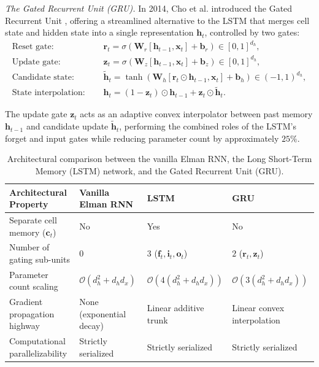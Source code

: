 \documentclass[../../main.tex]{subfiles}
\begin{document}
\textit{The Gated Recurrent Unit (GRU).} In 2014, Cho et al. introduced the Gated Recurrent Unit \citep{cho2014}, offering a streamlined alternative to the LSTM that merges cell state and hidden state into a single representation $\mathbf{h}_t$, controlled by two gates:
\begin{align}
\text{Reset gate: } & \quad \mathbf{r}_t = \sigma\left(\mathbf{W}_r \left[\mathbf{h}_{t-1}, \mathbf{x}_t\right] + \mathbf{b}_r\right) \in [0, 1]^{d_h}, \label{eq:gru_reset_gate} \\
\text{Update gate: } & \quad \mathbf{z}_t = \sigma\left(\mathbf{W}_z \left[\mathbf{h}_{t-1}, \mathbf{x}_t\right] + \mathbf{b}_z\right) \in [0, 1]^{d_h}, \label{eq:gru_update_gate} \\
\text{Candidate state: } & \quad \tilde{\mathbf{h}}_t = \tanh\left(\mathbf{W}_h \left[\mathbf{r}_t \odot \mathbf{h}_{t-1}, \mathbf{x}_t\right] + \mathbf{b}_h\right) \in (-1, 1)^{d_h}, \label{eq:gru_candidate} \\
\text{State interpolation: } & \quad \mathbf{h}_t = \left(1 - \mathbf{z}_t\right) \odot \mathbf{h}_{t-1} + \mathbf{z}_t \odot \tilde{\mathbf{h}}_t. \label{eq:gru_update}
\end{align}

The update gate $\mathbf{z}_t$ acts as an adaptive convex interpolator between past memory $\mathbf{h}_{t-1}$ and candidate update $\tilde{\mathbf{h}}_t$, performing the combined roles of the LSTM's forget and input gates while reducing parameter count by approximately $25\%$.

\begin{table}[htbp]
\centering
\small
\begin{tabularx}{\textwidth}{l X X X}
\toprule
\textbf{Architectural Property} & \textbf{Vanilla Elman RNN} & \textbf{LSTM} & \textbf{GRU} \\
\midrule
Separate cell memory ($\mathbf{c}_t$) & No & Yes & No \\
Number of gating sub-units & $0$ & $3$ ($\mathbf{f}_t, \mathbf{i}_t, \mathbf{o}_t$) & $2$ ($\mathbf{r}_t, \mathbf{z}_t$) \\
Parameter count scaling & $\mathcal{O}\left(d_h^2 + d_h d_x\right)$ & $\mathcal{O}\left(4(d_h^2 + d_h d_x)\right)$ & $\mathcal{O}\left(3(d_h^2 + d_h d_x)\right)$ \\
Gradient propagation highway & None (exponential decay) & Linear additive trunk & Linear convex interpolation \\
Computational parallelizability & Strictly serialized & Strictly serialized & Strictly serialized \\
\bottomrule
\end{tabularx}
\caption{Architectural comparison between the vanilla Elman RNN, the Long Short-Term Memory (LSTM) network, and the Gated Recurrent Unit (GRU).}
\label{tab:rnn_architectures_comparison}
\end{table}
\end{document}

